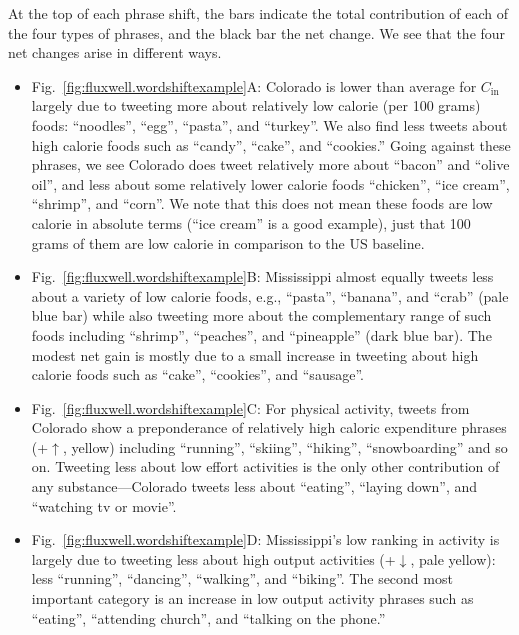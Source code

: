 \documentclass[10pt]{article}
\newcommand{\calin}{C_{\textrm{in}}}
\begin{document}
At the top of each phrase shift, the bars indicate the total
contribution of each of the four types of phrases, and the black
bar the net change.
We see that the four net changes arise in different ways.
\begin{itemize}
\item 
  Fig.~\ref{fig:fluxwell.wordshiftexample}A:
  Colorado is lower than average for $\calin$ largely due
  to tweeting more about relatively low calorie (per 100 grams) foods: ``noodles'',
  ``egg'', ``pasta'', and ``turkey''.  
  We also find
  less tweets about high calorie foods such as ``candy'', ``cake'',
  and ``cookies.''
  Going against these phrases, we see 
  Colorado does tweet relatively more about ``bacon'' and ``olive oil'',
  and less about some relatively lower calorie foods ``chicken'', ``ice
  cream'', ``shrimp'', and ``corn''.
  We note that this does not mean these foods are low calorie
  in absolute terms
  (``ice cream'' is a good example),
  just that 100 grams of them are low calorie in comparison to the US
  baseline.
\item 
  Fig.~\ref{fig:fluxwell.wordshiftexample}B:
  Mississippi almost equally tweets less about a variety
  of low calorie foods, e.g., ``pasta'', ``banana'', and ``crab'' (pale blue bar) 
  while also tweeting more about the complementary range
  of such foods including ``shrimp'', ``peaches'', and ``pineapple'' (dark
  blue bar).
  The modest net gain is mostly due to a small increase
  in tweeting about high calorie foods such 
  as ``cake'', ``cookies'', and ``sausage''.
\item 
  Fig.~\ref{fig:fluxwell.wordshiftexample}C:
  For physical activity, tweets from Colorado show a preponderance
  of relatively high caloric expenditure phrases (+$\uparrow$, yellow)
  including ``running'', ``skiing'', ``hiking'', ``snowboarding'' and
  so on.
  Tweeting less about low effort activities
  is the only other contribution of any substance---Colorado 
  tweets less about ``eating'',
  ``laying down'',
  and ``watching tv or movie''.
\item 
  Fig.~\ref{fig:fluxwell.wordshiftexample}D:
  Mississippi's low ranking in activity is largely
  due to tweeting less about high output activities (+$\downarrow$, pale yellow):
  less ``running'', ``dancing'', ``walking'', and ``biking''.
  The second most important category is an increase
  in low output activity phrases such
  as ``eating'', ``attending church'', and ``talking on the phone.''
\end{itemize}
\end{document}
